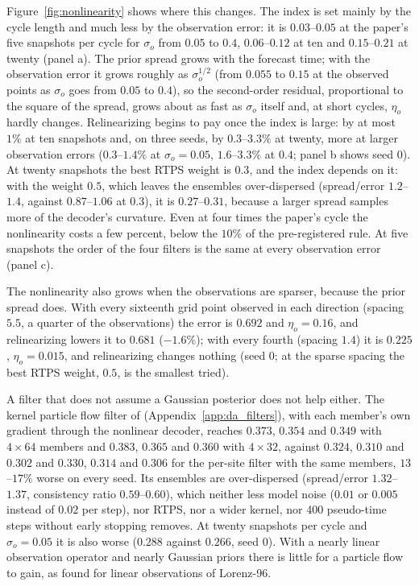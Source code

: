 Figure~\ref{fig:nonlinearity} shows where this changes. The index is set mainly by
the cycle length and much less by the observation error: it is $0.03$--$0.05$ at the
paper's five snapshots per cycle for $\sigma_o$ from $0.05$ to $0.4$,
$0.06$--$0.12$ at ten and $0.15$--$0.21$ at twenty (panel a). The prior spread
grows with the forecast time; with the observation error it grows roughly
as $\sigma_o^{1/2}$ (from $0.055$ to $0.15$ at the observed points as $\sigma_o$
goes from $0.05$ to $0.4$), so the second-order residual, proportional to
the square of the spread, grows about as fast as $\sigma_o$ itself and,
at short cycles, $\eta_o$ hardly changes. Relinearizing begins to pay once the index is large: by
at most $1\%$ at ten snapshots and, on three seeds, by $0.3$--$3.3\%$ at twenty,
more at larger observation errors ($0.3$--$1.4\%$ at $\sigma_o=0.05$,
$1.6$--$3.3\%$ at $0.4$; panel b shows seed 0). At twenty snapshots the best RTPS
weight is $0.3$, and the index depends on it: with the weight $0.5$, which
leaves the ensembles over-dispersed (spread/error $1.2$--$1.4$, against
$0.87$--$1.06$ at $0.3$), it is $0.27$--$0.31$, because a larger spread samples
more of the decoder's curvature. Even at four times the paper's cycle the
nonlinearity costs a few percent, below the $10\%$ of the pre-registered rule.
At five snapshots the order of the four filters is the same at every
observation error (panel c).

The nonlinearity also grows when the observations are sparser, because the
prior spread does. With every sixteenth grid point observed in each
direction (spacing $5.5$, a quarter of the observations) the error is
$0.692$ and $\eta_o=0.16$, and relinearizing lowers it to $0.681$ ($-1.6\%$);
with every fourth (spacing $1.4$) it is $0.225$, $\eta_o=0.015$, and
relinearizing changes nothing (seed 0; at the sparse spacing the best RTPS
weight, $0.5$, is the smallest tried).

A filter that does not assume a Gaussian posterior does not help either.
The kernel particle flow filter of \citet{huvanleeuwen2021}
(Appendix~\ref{app:da_filters}), with each member's own gradient through
the nonlinear decoder, reaches $0.373$, $0.354$ and $0.349$ with $4\times64$
members and $0.383$, $0.365$ and $0.360$ with $4\times32$, against $0.324$,
$0.310$ and $0.302$ and $0.330$, $0.314$ and $0.306$ for the per-site filter
with the same members, $13$--$17\%$ worse on every seed. Its ensembles are
over-dispersed (spread/error $1.32$--$1.37$, consistency ratio $0.59$--$0.60$),
which neither less model noise ($0.01$ or $0.005$ instead of $0.02$ per step),
nor RTPS, nor a wider kernel, nor 400 pseudo-time steps without early
stopping removes.
At twenty snapshots per cycle and $\sigma_o=0.05$ it is also worse ($0.288$ against $0.266$, seed 0).
With a nearly linear observation operator and nearly Gaussian priors there
is little for a particle flow to gain, as \citet{huvanleeuwen2021} found
for linear observations of Lorenz-96.

